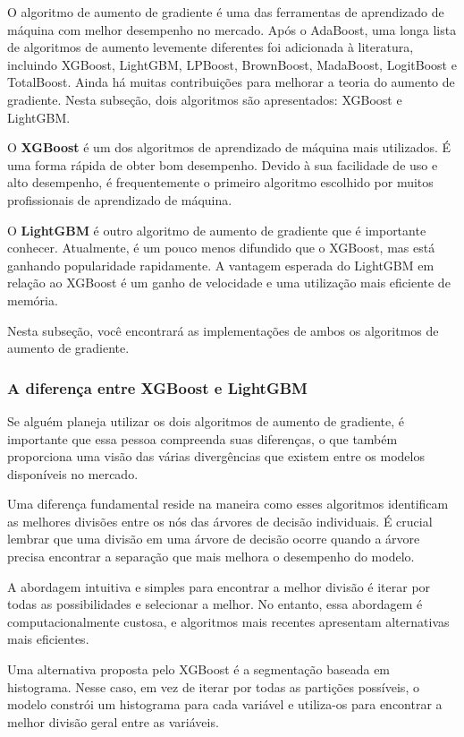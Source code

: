 O algoritmo de aumento de gradiente é uma das ferramentas de aprendizado de máquina com melhor desempenho no mercado. Após o AdaBoost, uma longa lista de algoritmos de aumento levemente diferentes foi adicionada à literatura, incluindo XGBoost, LightGBM, LPBoost, BrownBoost, MadaBoost, LogitBoost e TotalBoost. Ainda há muitas contribuições para melhorar a teoria do aumento de gradiente. Nesta subseção, dois algoritmos são apresentados: XGBoost e LightGBM.

O \textbf{XGBoost} é um dos algoritmos de aprendizado de máquina mais utilizados. É uma forma rápida de obter bom desempenho. Devido à sua facilidade de uso e alto desempenho, é frequentemente o primeiro algoritmo escolhido por muitos profissionais de aprendizado de máquina.

O \textbf{LightGBM} é outro algoritmo de aumento de gradiente que é importante conhecer. Atualmente, é um pouco menos difundido que o XGBoost, mas está ganhando popularidade rapidamente. A vantagem esperada do LightGBM em relação ao XGBoost é um ganho de velocidade e uma utilização mais eficiente de memória.

Nesta subseção, você encontrará as implementações de ambos os algoritmos de aumento de gradiente.

\subsubsection{A diferen\c ca entre XGBoost e LightGBM}

Se alguém planeja utilizar os dois algoritmos de aumento de gradiente, é importante que essa pessoa compreenda suas diferenças, o que também proporciona uma visão das várias divergências que existem entre os modelos disponíveis no mercado.

Uma diferença fundamental reside na maneira como esses algoritmos identificam as melhores divisões entre os nós das árvores de decisão individuais. É crucial lembrar que uma divisão em uma árvore de decisão ocorre quando a árvore precisa encontrar a separação que mais melhora o desempenho do modelo.

A abordagem intuitiva e simples para encontrar a melhor divisão é iterar por todas as possibilidades e selecionar a melhor. No entanto, essa abordagem é computacionalmente custosa, e algoritmos mais recentes apresentam alternativas mais eficientes.

Uma alternativa proposta pelo XGBoost é a segmentação baseada em histograma. Nesse caso, em vez de iterar por todas as partições possíveis, o modelo constrói um histograma para cada variável e utiliza-os para encontrar a melhor divisão geral entre as variáveis.

